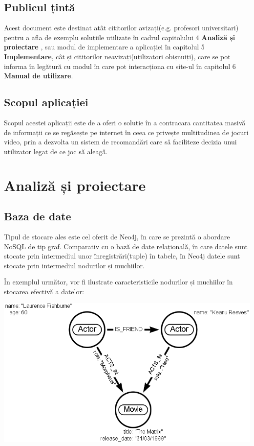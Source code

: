 \documentclass[12pt,a4paper]{report}
\begin{document}
\subsection{Publicul țintă}
Acest document este destinat atât cititorilor avizați(e.g. profesori universitari) pentru a afla de exemplu soluțiile utilizate în cadrul capitolului 4 \textbf{Analiză și proiectare} , sau modul de implementare a aplicației în capitolul 5 \textbf{Implementare}, cât și cititorilor neavizați(utilizatori obișnuiți), care se pot informa în legătură cu modul în care pot interacționa cu site-ul în capitolul 6 \textbf{Manual de utilizare}.
\subsection{Scopul aplicației}
Scopul acestei aplicații este de a oferi o soluție în a contracara cantitatea masivă de informații ce se regăsește pe internet \cite{5} în ceea ce privește multitudinea de jocuri video, prin a dezvolta un sistem de recomandări care să faciliteze decizia unui utilizator legat de ce joc să aleagă.  




\section{Analiză și proiectare}
\subsection{Baza de date}

Tipul de stocare ales este cel oferit de Neo4j, în care se prezintă o abordare NoSQL de tip graf.  Comparativ cu o bază de date relațională, în care datele sunt stocate prin intermediul unor înregistrări(tuple) în tabele, în Neo4j datele sunt stocate prin intermediul nodurilor și muchiilor.

În exemplul următor, vor fi ilustrate caracteristicile nodurilor și muchiilor în stocarea efectivă a datelor:


\includegraphics[scale=0.5]{exemplu_1_neo4j}
\hfill \break
\hfill \break
\hfill \break
\end{document}
